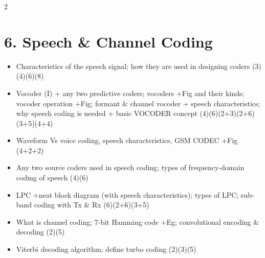 \documentclass[10pt]{article}
\begin{document}
\begin{multicols}{2}
\section*{6. Speech \& Channel Coding}
\begin{itemize}
  \item Characteristics of the speech signal; how they are used in designing coders \hfill (3)(4)(6)(8)
  \item Vocoder (I) + any two predictive coders; vocoders +Fig and their kinds; vocoder operation +Fig; formant \& channel vocoder + speech characteristics; why speech coding is needed + basic VOCODER concept \hfill (4)(6)(2+3)(2+6)(3+5)(4+4)
  \item Waveform Vs voice coding, speech characteristics, GSM CODEC +Fig \hfill (4+2+2)
  \item Any two source coders used in speech coding; types of frequency-domain coding of speech \hfill (4)(6)
  \item LPC +neat block diagram (with speech characteristics); types of LPC; sub-band coding with Tx \& Rx \hfill (6)(2+6)(3+5)
  \item What is channel coding; 7-bit Hamming code +Eg; convolutional encoding \& decoding \hfill (2)(5)
  \item Viterbi decoding algorithm; define turbo coding \hfill (2)(3)(5)
\end{itemize}


\end{multicols}
\end{document}
